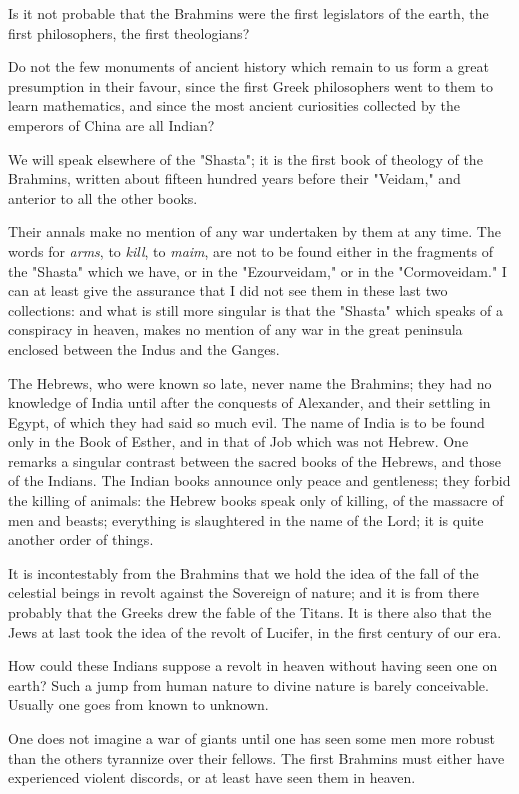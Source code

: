 Is it not probable that the Brahmins were the first legislators of the
earth, the first philosophers, the first theologians?

Do not the few monuments of ancient history which remain to us form a
great presumption in their favour, since the first Greek philosophers
went to them to learn mathematics, and since the most ancient
curiosities collected by the emperors of China are all Indian?

We will speak elsewhere of the "Shasta"; it is the first book of
theology of the Brahmins, written about fifteen hundred years before
their "Veidam," and anterior to all the other books.

Their annals make no mention of any war undertaken by them at any time.
The words for \textit{arms}, to \textit{kill}, to \textit{maim}, are not to be found either
in the fragments of the "Shasta" which we have, or in the "Ezourveidam,"
or in the "Cormoveidam." I can at least give the assurance that I did
not see them in these last two collections: and what is still more
singular is that the "Shasta" which speaks of a conspiracy in heaven,
makes no mention of any war in the great peninsula enclosed between the
Indus and the Ganges.

The Hebrews, who were known so late, never name the Brahmins; they had
no knowledge of India until after the conquests of Alexander, and their
settling in Egypt, of which they had said so much evil. The name of
India is to be found only in the Book of Esther, and in that of Job
which was not Hebrew. One remarks a singular contrast between the sacred
books of the Hebrews, and those of the Indians. The Indian books
announce only peace and gentleness; they forbid the killing of animals:
the Hebrew books speak only of killing, of the massacre of men and
beasts; everything is slaughtered in the name of the Lord; it is quite
another order of things.

It is incontestably from the Brahmins that we hold the idea of the fall
of the celestial beings in revolt against the Sovereign of nature; and
it is from there probably that the Greeks drew the fable of the Titans.
It is there also that the Jews at last took the idea of the revolt of
Lucifer, in the first century of our era.

How could these Indians suppose a revolt in heaven without having seen
one on earth? Such a jump from human nature to divine nature is barely
conceivable. Usually one goes from known to unknown.

One does not imagine a war of giants until one has seen some men more
robust than the others tyrannize over their fellows. The first Brahmins
must either have experienced violent discords, or at least have seen
them in heaven.

